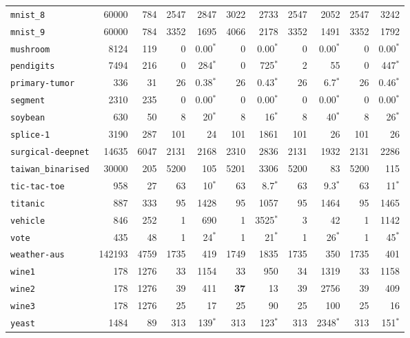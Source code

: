 \begin{tabular}{lccrrrrrrrr}
\texttt{mnist\_8} & \multicolumn{1}{r}{60000} & \multicolumn{1}{r}{784}  & 2547 & 2847 & 3022 & 2733 & 2547 & 2052 & 2547 & 3242\\
\texttt{mnist\_9} & \multicolumn{1}{r}{60000} & \multicolumn{1}{r}{784}  & 3352 & 1695 & 4066 & 2178 & 3352 & 1491 & 3352 & 1792\\
\texttt{mushroom} & \multicolumn{1}{r}{8124} & \multicolumn{1}{r}{119}  & 0 & 0.00$^*$ & 0 & 0.00$^*$ & 0 & 0.00$^*$ & 0 & 0.00$^*$\\
\texttt{pendigits} & \multicolumn{1}{r}{7494} & \multicolumn{1}{r}{216}  & 0 & 284$^*$ & 0 & 725$^*$ & 2 & 55 & 0 & 447$^*$\\
\texttt{primary-tumor} & \multicolumn{1}{r}{336} & \multicolumn{1}{r}{31}  & 26 & 0.38$^*$ & 26 & 0.43$^*$ & 26 & 6.7$^*$ & 26 & 0.46$^*$\\
\texttt{segment} & \multicolumn{1}{r}{2310} & \multicolumn{1}{r}{235}  & 0 & 0.00$^*$ & 0 & 0.00$^*$ & 0 & 0.00$^*$ & 0 & 0.00$^*$\\
\texttt{soybean} & \multicolumn{1}{r}{630} & \multicolumn{1}{r}{50}  & 8 & 20$^*$ & 8 & 16$^*$ & 8 & 40$^*$ & 8 & 26$^*$\\
\texttt{splice-1} & \multicolumn{1}{r}{3190} & \multicolumn{1}{r}{287}  & 101 & 24 & 101 & 1861 & 101 & 26 & 101 & 26\\
\texttt{surgical-deepnet} & \multicolumn{1}{r}{14635} & \multicolumn{1}{r}{6047}  & 2131 & 2168 & 2310 & 2836 & 2131 & 1932 & 2131 & 2286\\
\texttt{taiwan\_binarised} & \multicolumn{1}{r}{30000} & \multicolumn{1}{r}{205}  & 5200 & 105 & 5201 & 3306 & 5200 & 83 & 5200 & 115\\
\texttt{tic-tac-toe} & \multicolumn{1}{r}{958} & \multicolumn{1}{r}{27}  & 63 & 10$^*$ & 63 & 8.7$^*$ & 63 & 9.3$^*$ & 63 & 11$^*$\\
\texttt{titanic} & \multicolumn{1}{r}{887} & \multicolumn{1}{r}{333}  & 95 & 1428 & 95 & 1057 & 95 & 1464 & 95 & 1465\\
\texttt{vehicle} & \multicolumn{1}{r}{846} & \multicolumn{1}{r}{252}  & 1 & 690 & 1 & 3525$^*$ & 3 & 42 & 1 & 1142\\
\texttt{vote} & \multicolumn{1}{r}{435} & \multicolumn{1}{r}{48}  & 1 & 24$^*$ & 1 & 21$^*$ & 1 & 26$^*$ & 1 & 45$^*$\\
\texttt{weather-aus} & \multicolumn{1}{r}{142193} & \multicolumn{1}{r}{4759}  & 1735 & 419 & 1749 & 1835 & 1735 & 350 & 1735 & 401\\
\texttt{wine1} & \multicolumn{1}{r}{178} & \multicolumn{1}{r}{1276}  & 33 & 1154 & 33 & 950 & 34 & 1319 & 33 & 1158\\
\texttt{wine2} & \multicolumn{1}{r}{178} & \multicolumn{1}{r}{1276}  & 39 & 411 & \textbf{37} & 13 & 39 & 2756 & 39 & 409\\
\texttt{wine3} & \multicolumn{1}{r}{178} & \multicolumn{1}{r}{1276}  & 25 & 17 & 25 & 90 & 25 & 100 & 25 & 16\\
\texttt{yeast} & \multicolumn{1}{r}{1484} & \multicolumn{1}{r}{89}  & 313 & 139$^*$ & 313 & 123$^*$ & 313 & 2348$^*$ & 313 & 151$^*$\\
\bottomrule
\end{tabular}
